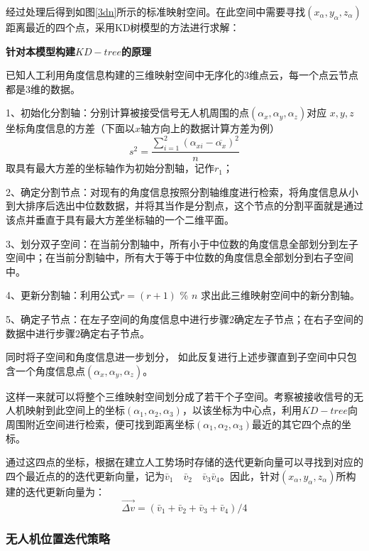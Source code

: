 \documentclass{my_paper}
\begin{document}
经过处理后得到如图\ref{3dn}所示的标准映射空间。在此空间中需要寻找$(x_{\alpha}, y_{\alpha}, z_{\alpha})$距离最近的四个点，采用KD树模型的方法进行求解：

\textbf{针对本模型构建$KD-tree$的原理}

已知人工利用角度信息构建的三维映射空间中无序化的3维点云，每一个点云节点都是3维的数据。

1、初始化分割轴：分别计算被接受信号无人机周围的点$(\alpha_x,\alpha_y,\alpha_z)$对应 $x,y,z$ 坐标角度信息的方差（下面以$x$轴方向上的数据计算方差为例）
$$
s^2 = \frac{\sum_{i=1}^2(\alpha_{xi}-\overline{\alpha_{x}})^2}{n}
$$
取具有最大方差的坐标轴作为初始分割轴，记作$r_1$；

2、确定分割节点：对现有的角度信息按照分割轴维度进行检索，将角度信息从小到大排序后选出中位数数据，并将其当作是分割点，这个节点的分割平面就是通过该点并垂直于具有最大方差坐标轴的一个二维平面。

3、划分双子空间：在当前分割轴中，所有小于中位数的角度信息全部划分到左子空间中；在当前分割轴中，所有大于等于中位数的角度信息全部划分到右子空间中。

4、更新分割轴：利用公式$r = (r+1) $ \% $n$ 求出此三维映射空间中的新分割轴。

5、确定子节点：在左子空间的角度信息中进行步骤2确定左子节点；在右子空间的数据中进行步骤2确定右子节点。

同时将子空间和角度信息进一步划分， 如此反复进行上述步骤直到子空间中只包含一个角度信息点$(\alpha_x,\alpha_y,\alpha_z)$。

这样一来就可以将整个三维映射空间划分成了若干个子空间。考察被接收信号的无人机映射到此空间上的坐标$(\alpha_1,\alpha_2,\alpha_3)$，以该坐标为中心点，利用$KD-tree$向周围附近空间进行检索，便可找到距离坐标$(\alpha_1,\alpha_2,\alpha_3)$最近的其它四个点的坐标。


通过这四点的坐标，根据在建立人工势场时存储的迭代更新向量可以寻找到对应的四个最近点的的迭代更新向量，记为$\bar v_1 \quad \bar v_2 \quad \bar v_3 \bar v_4$。因此，针对$(x_{\alpha} , y_{\alpha} , z_{\alpha})$所构建的迭代更新向量为：
\begin{equation}
    \overrightarrow{\Delta v} = (\bar v_1 + \bar v_2 + \bar v_3 + \bar v_4)/ 4
\end{equation}





\subsubsection{无人机位置迭代策略}
\end{document}

